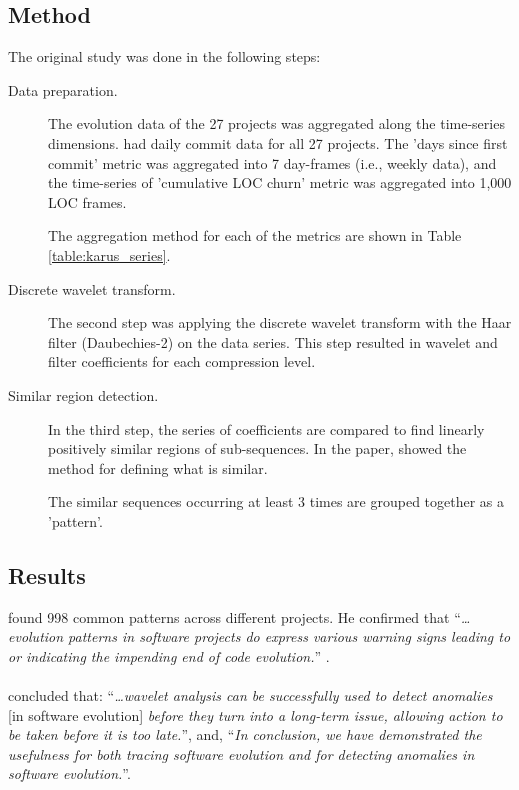 

\subsection{Method}
The original study was done in the following steps:
\begin{description}
	\item[Data preparation.] The evolution data of the 27 projects was aggregated
		along the time-series dimensions. \citeauthor{karus2013} had daily commit
		data for all 27 projects. The 'days since first commit' metric was aggregated
		into 7 day-frames (i.e., weekly data), and the time-series of 'cumulative LOC
		churn' metric was aggregated into 1,000 LOC frames.
		
		The aggregation method for each of the metrics are shown in Table
		\ref{table:karus_series}.
		
	\item[Discrete wavelet transform.] The second step was applying the discrete
		wavelet transform with the Haar filter (Daubechies-2) on the data series.
		This step resulted in wavelet and filter coefficients for each compression
		level.
		
	\item[Similar region detection.] In the third step, the series of coefficients
		are compared to find linearly positively similar regions of sub-sequences. In
		the paper, \citet{karus2013} showed the method for defining what is similar.

		The similar sequences occurring at least 3 times are grouped together as a
		'pattern'.
\end{description}

\subsection{Results}
\citeauthor{karus2013} found 998 common patterns across different projects. He
confirmed that ``\textit{\ldots{}evolution patterns in software projects do
express various warning signs leading to or indicating the impending end of
code evolution.}'' \cite{karus2013}.

\paragraph{}
\citet{karus2013} concluded that: ``\textit{\ldots{}wavelet analysis can be
successfully used to detect anomalies} [in software evolution] \textit{before
they turn into a long-term issue, allowing action to be taken before it is too
late.}'', and, ``\textit{In conclusion, we have demonstrated the usefulness
for both tracing software evolution and for detecting anomalies in software
evolution.}''.

